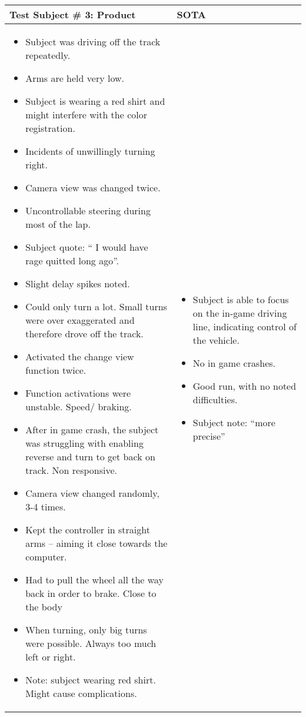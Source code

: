 \begin{table}[!htbp]
\centering
\begin{tabular}{| p{3.4in} | p{2in} |}
\hline
	\textbf{Test Subject \# 3: Product} & \textbf{SOTA}\\
\hline
	\begin{itemize}
		\item Subject was driving off the track repeatedly.
		\item Arms are held very low.
		\item Subject is wearing a red shirt and might interfere with the color registration.
		\item Incidents of unwillingly turning right.
		\item Camera view was changed twice.
		\item Uncontrollable steering during most of the lap.
		\item Subject quote: “ I would have rage quitted long ago”.
		\item Slight delay spikes noted.
		\item Could only turn a lot. Small turns were over exaggerated and therefore drove off the track.
		\item Activated the change view function twice.
		\item Function activations were unstable. Speed/ braking.
		\item After in game crash, the subject was struggling with enabling reverse and turn to get back on track. Non responsive.
		\item Camera view changed randomly, 3-4 times.
		\item Kept the controller in straight arms – aiming it close towards the computer.
		\item Had to pull the wheel all the way back in order to brake. Close to the body
		\item When turning, only big turns were possible. Always too much left or right.
		\item Note: subject wearing red shirt. Might cause complications.
	\end{itemize}
	&
	\begin{itemize}
		\item Subject is able to focus on the in-game driving line, indicating control of the vehicle.
		\item No in game crashes.
		\item Good run, with no noted difficulties.
		\item Subject note: “more precise”
	\end{itemize}
	\\
\hline
\end{tabular}
\end{table}


